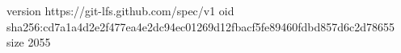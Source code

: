 version https://git-lfs.github.com/spec/v1
oid sha256:cd7a1a4d2e2f477ea4e2dc94ec01269d12fbacf5fe89460fdbd857d6c2d78655
size 2055
